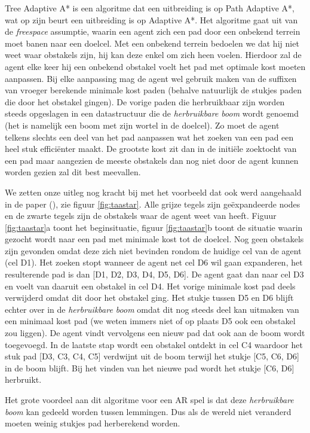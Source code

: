 Tree Adaptive A* is een algoritme dat een uitbreiding is op Path Adaptive A*, wat op zijn beurt een uitbreiding is op Adaptive A*. Het algoritme gaat uit van de \textit{freespace} assumptie, waarin een agent zich een pad door een onbekend terrein moet banen naar een doelcel. Met een onbekend terrein bedoelen we dat hij niet weet waar obstakels zijn, hij kan deze enkel om zich heen voelen. Hierdoor zal de agent elke keer hij een onbekend obstakel voelt het pad met optimale kost moeten aanpassen. Bij elke aanpassing mag de agent wel gebruik maken van de suffixen van vroeger berekende minimale kost paden (behalve natuurlijk de stukjes paden die door het obstakel gingen). De vorige paden die herbruikbaar zijn worden steeds opgeslagen in een datastructuur die de \textit{herbruikbare boom} wordt genoemd (het is namelijk een boom met zijn wortel in de doelcel). Zo moet de agent telkens slechts een deel van het pad aanpassen wat het zoeken van een pad een heel stuk effici\"enter maakt. De grootste kost zit dan in de initi\"ele zoektocht van een pad maar aangezien de meeste obstakels dan nog niet door de agent kunnen worden gezien zal dit best meevallen. 

We zetten onze uitleg nog kracht bij met het voorbeeld dat ook werd aangehaald in de paper (\cite{hernandez2011tree}), zie figuur \ref{fig:taastar}. Alle grijze tegels zijn ge\"expandeerde nodes en de zwarte tegels zijn de obstakels waar de agent weet van heeft. Figuur \ref{fig:taastar}a toont het beginsituatie, figuur \ref{fig:taastar}b toont de situatie waarin gezocht wordt naar een pad met minimale kost tot de doelcel. Nog geen obstakels zijn gevonden omdat deze zich niet bevinden rondom de huidige cel van de agent (cel D1). Het zoeken stopt wanneer de agent net cel D6 wil gaan expanderen, het resulterende pad is dan [D1, D2, D3, D4, D5, D6]. De agent gaat dan naar cel D3 en voelt van daaruit een obstakel in cel D4. Het vorige minimale kost pad deels verwijderd omdat dit door het obstakel ging. Het stukje tussen D5 en D6 blijft echter over in de \textit{herbruikbare boom} omdat dit nog steeds deel kan uitmaken van een minimaal kost pad (we weten immers niet of op plaats D5 ook een obstakel zou liggen). De agent vindt vervolgens een nieuw pad dat ook aan de boom wordt toegevoegd. In de laatste stap wordt een obstakel ontdekt in cel C4 waardoor het stuk pad [D3, C3, C4, C5] verdwijnt uit de boom terwijl het stukje [C5, C6, D6] in de boom blijft. Bij het vinden van het nieuwe pad wordt het stukje [C6, D6] herbruikt.

Het grote voordeel aan dit algoritme voor een AR spel is dat deze \textit{herbruikbare boom} kan gedeeld worden tussen lemmingen. Dus als de wereld niet veranderd moeten weinig stukjes pad herberekend worden.


